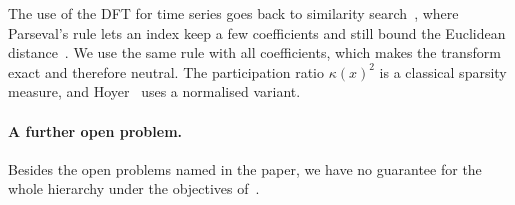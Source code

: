 \documentclass[11pt]{article}
\theoremstyle{remark}\newtheorem{remark}{Remark}\renewcommand{\theremark}{S\arabic{remark}}
\begin{document}
The use of the DFT for time series goes back to similarity search~\cite{agrawal1993efficient}, where Parseval's rule lets an index keep a few coefficients and still bound the Euclidean distance~\cite{rafiei1997similarity,rafiei1998dft}. We use the same rule with all coefficients, which makes the transform exact and therefore neutral. The participation ratio $\kappa(x)^2$ is a classical sparsity measure, and Hoyer~\cite{hoyer2004nonnegative} uses a normalised variant.

\paragraph{A further open problem.} Besides the open problems named in the paper, we have no guarantee for the whole hierarchy under the objectives of~\cite{dasgupta2016cost,moseley2017approximation}.
\end{document}
